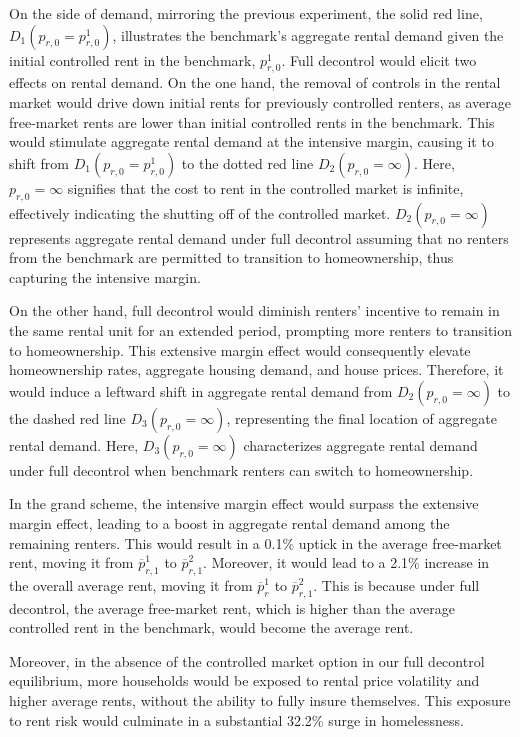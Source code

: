 \documentclass[parskip=full]{article}
\begin{document}
On the side of demand, mirroring the previous experiment, the solid red line, $D_{1}(p_{r,0}=p^{1}_{r,0})$, illustrates the benchmark's aggregate rental demand given the initial controlled rent in the benchmark, $p^{1}_{r,0}$. Full decontrol would elicit two effects on rental demand. On the one hand, the removal of controls in the rental market would drive down initial rents for previously controlled renters, as average free-market rents are lower than initial controlled rents in the benchmark. This would stimulate aggregate rental demand at the intensive margin, causing it to shift from $D_{1}(p_{r,0}=p^{1}_{r,0})$ to the dotted red line $D_{2}(p_{r,0}=\infty)$. Here, $p_{r,0}=\infty$ signifies that the cost to rent in the controlled market is infinite, effectively indicating the shutting off of the controlled market. $D_{2}(p_{r,0}=\infty)$ represents aggregate rental demand under full decontrol assuming that no renters from the benchmark are permitted to transition to homeownership, thus capturing the intensive margin.

On the other hand, full decontrol would diminish renters' incentive to remain in the same rental unit for an extended period, prompting more renters to transition to homeownership. This extensive margin effect would consequently elevate homeownership rates, aggregate housing demand, and house prices. Therefore, it would induce a leftward shift in aggregate rental demand from $D_{2}(p_{r,0}=\infty)$ to the dashed red line $D_{3}(p_{r,0}=\infty)$, representing the final location of aggregate rental demand. Here, $D_{3}(p_{r,0}=\infty)$ characterizes aggregate rental demand under full decontrol when benchmark renters can switch to homeownership.

In the grand scheme, the intensive margin effect would surpass the extensive margin effect, leading to a boost in aggregate rental demand among the remaining renters. This would result in a 0.1\% uptick in the average free-market rent, moving it from $\overline{p}^{1}_{r,1}$ to $\overline{p}^{2}_{r,1}$. Moreover, it would lead to a 2.1\% increase in the overall average rent, moving it from $\overline{p}^{1}_{r}$ to $\overline{p}^{2}_{r,1}$. This is because under full decontrol, the average free-market rent, which is higher than the average controlled rent in the benchmark, would become the average rent.

Moreover, in the absence of the controlled market option in our full decontrol equilibrium, more households would be exposed to rental price volatility and higher average rents, without the ability to fully insure themselves. This exposure to rent risk would culminate in a substantial 32.2\% surge in homelessness.
\end{document}
